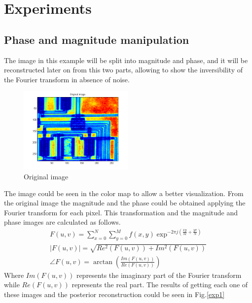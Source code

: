 \documentclass[a4paper, 10pt, conference] {article}
\begin{document}
\section{Experiments}
\subsection{Phase and magnitude manipulation}
The image in this example will be split into magnitude and phase, and it will be reconstructed later on from this two parts, allowing to show the inversibility of the Fourier transform in absence of noise. 
 \begin{figure}[H]
 	\centering
 	\includegraphics[width=0.5\textwidth]{reportImages/exp1_original.png} %
 	\caption{Original image}
 	\label{original}
 \end{figure} 
The image could be seen in the color map to allow a better visualization. From the original image the magnitude and the phase could be obtained applying  the Fourier transform for each pixel. This transformation and the magnitude and phase images are calculated as follows.
\begin{eqnarray}
F(u,v)=\sum_{x=0}^{N}\sum_{y=0}^{M}f(x,y)\exp^{-2\pi j\left(\frac{xy}{M}+\frac{yv}{N}\right)}\\
\left|F(u,v)\right|=\sqrt{Re^{2}\left(F(u,v)\right)+Im^{2}\left(F(u,v)\right)}\\
\angle F(u,v) = \arctan\left(\frac{Im\left(F(u,v)\right)}{Re\left(F(u,v)\right)}\right)
\end{eqnarray}
Where \textit{$Im\left(F(u,v)\right)$} represents the imaginary part of the Fourier transform while \textit{$Re\left(F(u,v)\right)$} represents the real part.
The results of getting each one of these images and the posterior reconstruction could be seen in Fig.\ref{exp1}
\end{document}
